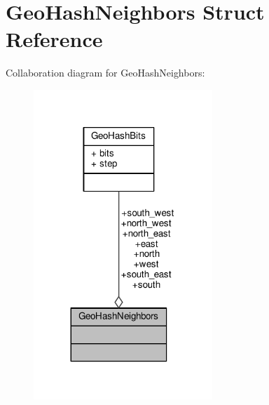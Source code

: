 \hypertarget{structGeoHashNeighbors}{}\section{Geo\+Hash\+Neighbors Struct Reference}
\label{structGeoHashNeighbors}


Collaboration diagram for Geo\+Hash\+Neighbors\+:\nopagebreak
\begin{figure}[H]
\begin{center}
\leavevmode
\includegraphics[width=191pt]{structGeoHashNeighbors__coll__graph}
\end{center}
\end{figure}
